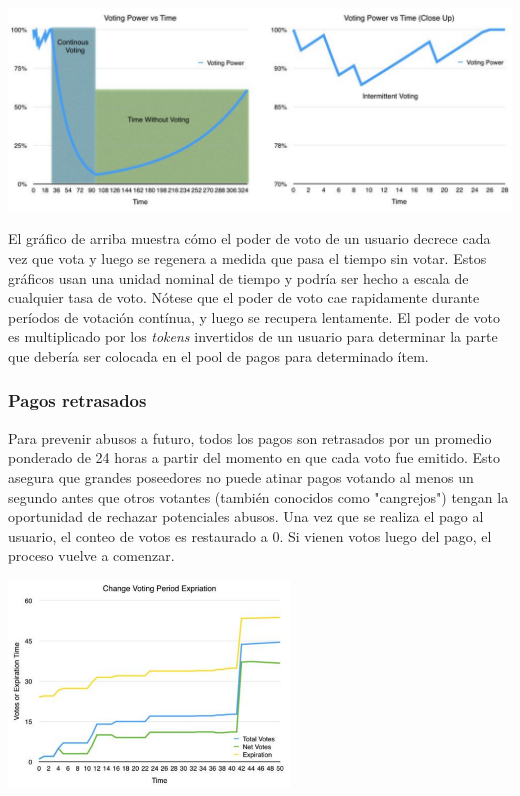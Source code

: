 \documentclass[a4paper,titlepage,final]{article}
\begin{document}
\begin{center}
\includegraphics[width=\textwidth]{fig/fig1}
\end{center}

El gráfico de arriba muestra cómo el poder de voto de un usuario decrece cada vez que vota y luego se regenera a medida que pasa el tiempo sin votar. Estos gráficos usan una unidad nominal de tiempo y podría ser hecho a escala de cualquier tasa de voto. Nótese que el poder de voto cae rapidamente durante períodos de votación contínua, y luego se recupera lentamente. El poder de voto es multiplicado por los \textit{tokens} invertidos de un usuario para determinar la parte que debería ser colocada en el pool de pagos para determinado ítem.

\subsubsection{Pagos retrasados}

Para prevenir abusos a futuro, todos los pagos son retrasados por un promedio ponderado de 24 horas a partir del momento en que cada voto fue emitido. Esto asegura que grandes poseedores no puede atinar pagos votando al menos un segundo antes que otros votantes (también conocidos como "cangrejos") tengan la oportunidad de rechazar potenciales abusos. Una vez que se realiza el pago al usuario, el conteo de votos es restaurado a 0. Si vienen votos luego del pago, el proceso vuelve a comenzar.

\begin{center}
\includegraphics[width=7.5cm]{fig/fig2}
\end{center}
\end{document}
